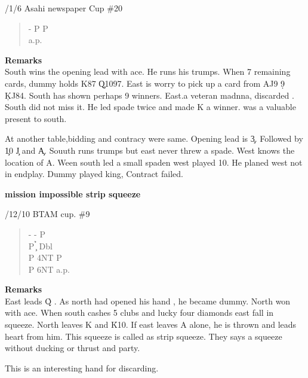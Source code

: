 /1/6 Asahi newspaper Cup \#20
\begin{quote}
%
  {}%
  {}
  {}%
  {}%
\end{quote}
\begin{quote}
\begin{bidding}
- \> P  \> P \h \\
a.p.
\end{bidding}
\end{quote}
{\bf Remarks}\\


South wins the opening lead with ace. He runs his trumps.
When 7 remaining cards, dummy holds \s K87 \c Q1097.
East is worry to pick up a card from  \s AJ9 \d 9 \c KJ84.
South has shown  perhaps 9 winners. East.a veteran madnna, 
discarded . South did not miss it. He led spade twice and
made \s K a winner.  was a valuable present to south.

At another table,bidding and contracy were same. Opening lead is \c 3.
Followed by \c 10 \c J and \c A. Souuth runs trumps but east never threw a
spade. West knows the location of \s A. Ween south led a small spaden
west played 10. He planed west not in endplay. Dummy played king,
Contract failed.

\vspace{0.5cm}
{\bf mission impossible strip squeeze}


/12/10 BTAM cup. \#9

\begin{quote}
%
  {}%
  {}
  {}%
  {}%
\end{quote}
\begin{quote}
\begin{bidding}
-  \> -  \> P \d \\
P \c {}\h \> Dbl \\
P \> 4NT \> P \s \\
P \> 6NT \> a.p.
\end{bidding}
\end{quote}
{\bf Remarks}\\

East leads \h Q . As north had opened his hand , he became dummy.
North won with ace. When south cashes 5 clubs and lucky four diamonds
east fall in squeeze. North leaves \s K and \h K10.
If east leaves \s A alone, he is thrown and leads heart from him.
This squeeze is called as strip squeeze. They says a squeeze 
without ducking or thrust and party.

This is an interesting hand for discarding.
